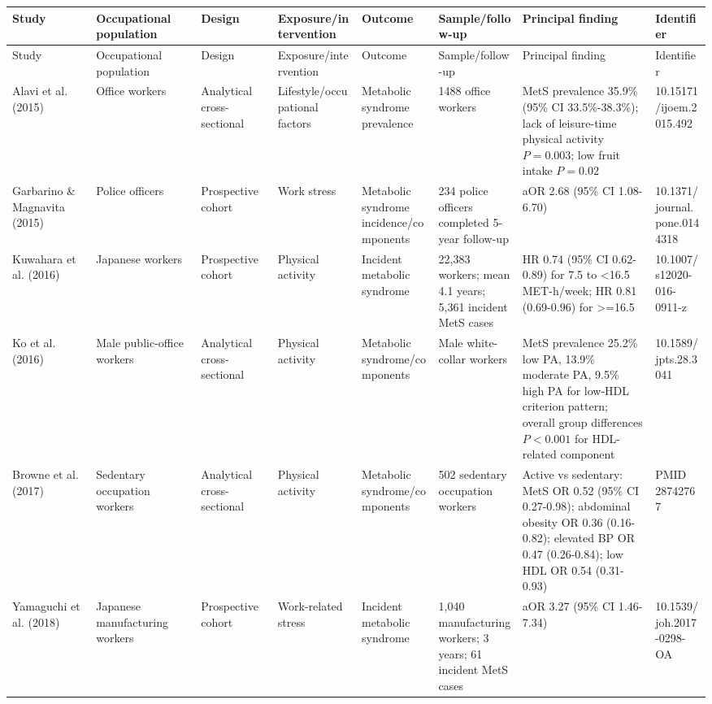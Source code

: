 \documentclass[10pt]{article}
\begin{document}
\scriptsize
\begin{landscape}
\begin{longtable}{p{0.12\linewidth} p{0.15\linewidth} p{0.11\linewidth} p{0.12\linewidth} p{0.11\linewidth} p{0.12\linewidth} p{0.19\linewidth} p{0.08\linewidth}}
\toprule
Study & Occupational population & Design & Exposure/intervention & Outcome & Sample/follow-up & Principal finding & Identifier \\
\midrule
\endfirsthead
\toprule
Study & Occupational population & Design & Exposure/intervention & Outcome & Sample/follow-up & Principal finding & Identifier \\
\midrule
\endhead
Alavi et al. (2015) & Office workers & Analytical cross-sectional & Lifestyle/occupational factors & Metabolic syndrome prevalence & 1488 office workers & MetS prevalence 35.9\% (95\% CI 33.5\%-38.3\%); lack of leisure-time physical activity \(P = 0.003\); low fruit intake \(P = 0.02\) & 10.15171/ijoem.2015.492 \\
Garbarino \& Magnavita (2015) & Police officers & Prospective cohort & Work stress & Metabolic syndrome incidence/components & 234 police officers completed 5-year follow-up & aOR 2.68 (95\% CI 1.08-6.70) & 10.1371/journal.pone.0144318 \\
Kuwahara et al. (2016) & Japanese workers & Prospective cohort & Physical activity & Incident metabolic syndrome & 22,383 workers; mean 4.1 years; 5,361 incident MetS cases & HR 0.74 (95\% CI 0.62-0.89) for 7.5 to <16.5 MET-h/week; HR 0.81 (0.69-0.96) for >=16.5 & 10.1007/s12020-016-0911-z \\
Ko et al. (2016) & Male public-office workers & Analytical cross-sectional & Physical activity & Metabolic syndrome/components & Male white-collar workers & MetS prevalence 25.2\% low PA, 13.9\% moderate PA, 9.5\% high PA for low-HDL criterion pattern; overall group differences \(P < 0.001\) for HDL-related component & 10.1589/jpts.28.3041 \\
Browne et al. (2017) & Sedentary occupation workers & Analytical cross-sectional & Physical activity & Metabolic syndrome/components & 502 sedentary occupation workers & Active vs sedentary: MetS OR 0.52 (95\% CI 0.27-0.98); abdominal obesity OR 0.36 (0.16-0.82); elevated BP OR 0.47 (0.26-0.84); low HDL OR 0.54 (0.31-0.93) & PMID 28742767 \\
Yamaguchi et al. (2018) & Japanese manufacturing workers & Prospective cohort & Work-related stress & Incident metabolic syndrome & 1,040 manufacturing workers; 3 years; 61 incident MetS cases & aOR 3.27 (95\% CI 1.46-7.34) & 10.1539/joh.2017-0298-OA \\

\end{longtable}
\end{landscape}
\end{document}
